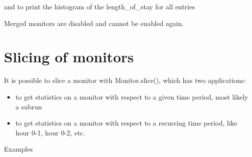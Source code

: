 \documentclass[letterpaper,10pt,english]{sphinxmanual}
\begin{document}
and to print the histogram of the length\_of\_stay for all entries

%
\begin{sphinxVerbatim}[commandchars=\\\{\}]
  
\end{sphinxVerbatim}

Merged monitors are disabled and cannot be enabled again.


\section{Slicing of monitors}
\label{\detokenize{Monitor:slicing-of-monitors}}
It is possible to slice a monitor with Monitor.slice(), which has two applications:
\begin{itemize}
\item {} 
to get statistics on a monitor with respect to a given time period, most likely a subrun

\item {} 
to get statistics on a monitor with respect to a recurring time period, like hour 0-1, hour 0-2, etc.

\end{itemize}

Examples
\end{document}
